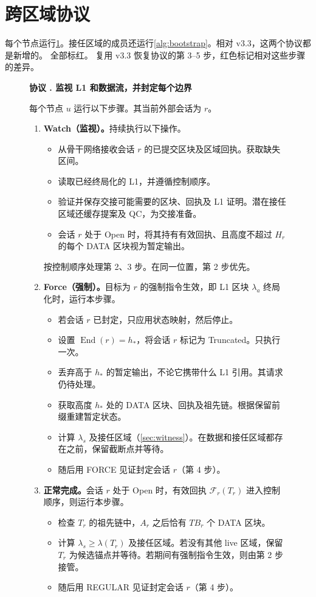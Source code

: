 \documentclass[11pt,a4paper]{article}
\newcommand{\FC}{\mathcal F}
\newcommand{\End}{\operatorname{End}}
\newcommand{\TB}{\mathit{TB}}
\newcounter{protocol}
\newenvironment{protocol}[2]{\begin{figure}[htbp]\refstepcounter{protocol}\label{#1}
\begin{mdframed}[linewidth=.6pt,skipabove=0pt,skipbelow=0pt,
innertopmargin=7pt,innerbottommargin=7pt]\small
\textbf{协议 \theprotocol. #2}\par\smallskip}{\end{mdframed}\end{figure}}
\begin{document}
\section{跨区域协议}\label{sec:xprotocols}
每个节点运行\cref{alg:external}。接任区域的成员还运行\cref{alg:bootstrap}。相对 v3.3，这两个协议都是新增的。 全部标红。 复用 v3.3 恢复协议的第 3--5 步，红色标记相对这些步骤的差异。

\begin{protocol}{alg:external}{监视 L1 和数据流，并封定每个边界}
\color{rrRed}
每个节点 $u$ 运行以下步骤。其当前外部会话为 $r$。
\begin{enumerate}[label=\textbf{\arabic*)},itemsep=3pt]
\item \textbf{Watch（监视）。}持续执行以下操作。
\begin{itemize}
\item 从骨干网络接收会话 $r$ 的已提交区块及区域回执。获取缺失区间。
\item 读取已经终局化的 L1，并遵循控制顺序。
\item 验证并保存交接可能需要的区块、回执及 L1 证明。潜在接任区域还缓存提案及 QC，为交接准备。
\item 会话 $r$ 处于 Open 时，将其持有有效回执、且高度不超过 $H_r$ 的每个 DATA 区块视为暂定输出。
\end{itemize}
按控制顺序处理第 2、3 步。在同一位置，第 2 步优先。

\item \textbf{Force（强制）。}目标为 $r$ 的强制指令生效，即 L1 区块 $\lambda_a$ 终局化时，运行本步骤。
\begin{itemize}
\item 若会话 $r$ 已封定，只应用状态映射，然后停止。
\item 设置 $\End(r)=h_*$，将会话 $r$ 标记为 Truncated。只执行一次。
\item 丢弃高于 $h_*$ 的暂定输出，不论它携带什么 L1 引用。其请求仍待处理。
\item 获取高度 $h_*$ 处的 DATA 区块、回执及祖先链。根据保留前缀重建暂定状态。
\item 计算 $\lambda_s$ 及接任区域（\cref{sec:witness}）。在数据和接任区域都存在之前，保留截断点并等待。
\item 随后用 FORCE 见证封定会话 $r$（第 4 步）。
\end{itemize}

\item \textbf{正常完成。}会话 $r$ 处于 Open 时，有效回执 $\FC_r(T_r)$ 进入控制顺序，则运行本步骤。
\begin{itemize}
\item 检查 $T_r$ 的祖先链中，$A_r$ 之后恰有 $\TB_r$ 个 DATA 区块。
\item 计算 $\lambda_s\ge\lambda(T_r)$ 及接任区域。若没有其他 live 区域，保留 $T_r$ 为候选锚点并等待。若期间有强制指令生效，则由第 2 步接管。
\item 随后用 REGULAR 见证封定会话 $r$（第 4 步）。
\end{itemize}


\end{enumerate}
\end{protocol}
\end{document}

